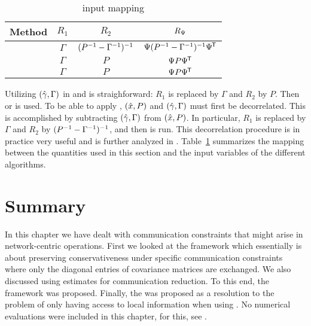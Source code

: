 \begin{table}[tb] 
	\centering
	\caption{\abbrGEVO input mapping} 
	\label{tab:cie:translation}
	\begin{footnotesize}
	\begin{tabular}{cccc}
		\toprule%
		\textbf{Method} & $R_1$ & $R_2$ & $R_\Psi$ \\
		\midrule
		\GEVOKF & $\Gamma$ & $(P^{-1}-\Gamma^{-1})^{-1}$ & $\Psi(P^{-1}-\Gamma^{-1})^{-1}\Psi^{\mkern-1.5mu\mathsf{T}}$ \\
		\GEVOCI & $\Gamma$ & $P$ & $\Psi P\Psi^{\mkern-1.5mu\mathsf{T}}$ \\
		\GEVOLE & $\Gamma$ & $P$ & $\Psi P\Psi^{\mkern-1.5mu\mathsf{T}}$ \\
		\bottomrule
	\end{tabular}
	\end{footnotesize}
\end{table}

Utilizing $(\hat{\gamma},\Gamma)$ in \GEVOCI and \GEVOLE is straighforward: $R_1$ is replaced by $\Gamma$ and $R_2$ by $P$. Then \GEVOCI or \GEVOLE is used. To be able to apply \GEVOKF, $(\hat{x},P)$ and $(\hat{\gamma},\Gamma)$ must first be decorrelated. This is accomplished by subtracting $(\hat{\gamma},\Gamma)$ from $(\hat{x},P)$. In particular, $R_1$ is replaced by $\Gamma$ and $R_2$ by $(P^{-1}-\Gamma^{-1})^{-1}$, and then \GEVOKF is run. This decorrelation procedure is in practice very useful and is further analyzed in \cite[Section~5.4.1]{Forsling2023Phd}. Table~\ref{tab:cie:translation} summarizes the mapping between the quantities used in this section and the input variables of the different \abbrGEVO algorithms. 







\section{Summary}

In this chapter we have dealt with communication constraints that might arise in network-centric operations. First we looked at the \abbrDCA framework which essentially is about preserving conservativeness under specific communication constraints where only the diagonal entries of covariance matrices are exchanged. We also discussed using \abbrDR estimates for communication reduction. To this end, the \abbrGEVO framework was proposed. Finally, the \abbrCIE was proposed as a resolution to the problem of only having access to local information when using \abbrGEVO. No numerical evaluations were included in this chapter, for this, see \cite[Chapter~5]{Forsling2023Phd}.




